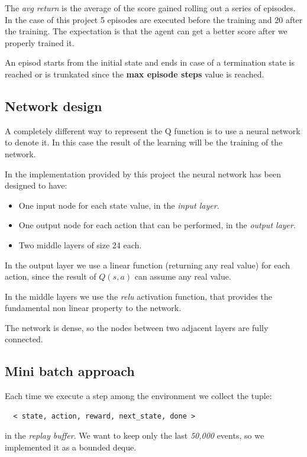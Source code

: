 \documentclass{article}
\begin{document}
The \emph{avg return} is the average of the score gained rolling out a series of episodes.
In the case of this project 5 episodes are executed before the training and 20 after the training.
The expectation is that the agent can get a better score after we properly trained it.

An episod starts from the initial state and ends in case of a termination state is reached or is trunkated since 
the \textbf{max episode steps} value is reached.

\subsection{Network design}

A completely different way to represent the Q function is to use a neural network to denote it.
In this case the result of the learning will be the training of the network.

In the implementation provided by this project the neural network has been designed to have:
\begin{itemize}
  \item One input node for each state value, in the \emph{input layer}.
  \item One output node for each action that can be performed, in the \emph{output layer}.
  \item Two middle layers of size 24 each.
\end{itemize}

In the output layer we use a linear function (returning any real value) for each action,
since the result of $Q(s,a)$ can assume any real value.

In the middle layers we use the \emph{relu} activation function, that provides the fundamental 
non linear property to the network.

The network is dense, so the nodes between two adjacent layers are fully connected.

\subsection{Mini batch approach}

Each time we execute a step among the environment we collect the tuple:

\begin{verbatim}
  < state, action, reward, next_state, done >
\end{verbatim}

in the \emph{replay buffer}.
We want to keep only the last \emph{50,000} events, so we implemented it as a bounded deque.
\end{document}
